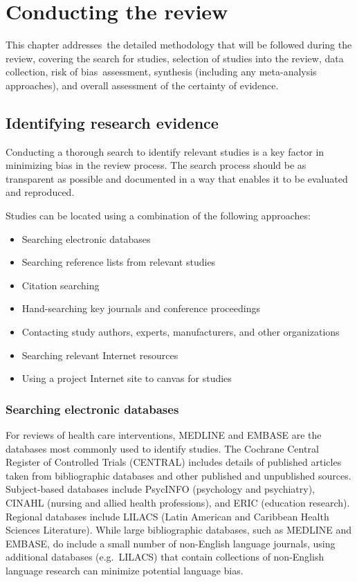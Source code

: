 \documentclass[
  11pt,
  a4paper,
  DIV=11,
  numbers=noendperiod]{scrreprt}
\begin{document}
\chapter{Conducting the
review}\label{sec-conducting-systematic-reviews-of-interventions}

This chapter addresses~the detailed methodology that will be followed
during the review, covering the search for studies, selection of studies
into the review, data collection, risk of bias~assessment, synthesis
(including any meta-analysis approaches), and overall assessment of the
certainty of evidence.~

\section{Identifying research
evidence}\label{identifying-research-evidence}

Conducting a thorough search to identify relevant studies is a key
factor in minimizing bias in the review process. The search process
should be as transparent as possible and documented in a way that
enables it to be evaluated and reproduced.

Studies can be located using a combination of the following approaches:

\begin{itemize}
\item
  Searching electronic databases
\item
  Searching reference lists from relevant studies
\item
  Citation searching
\item
  Hand-searching key journals and conference proceedings
\item
  Contacting study authors, experts, manufacturers, and other
  organizations
\item
  Searching relevant Internet resources
\item
  Using a project Internet site to canvas for studies
\end{itemize}

\subsection{Searching electronic
databases}\label{searching-electronic-databases}

For reviews of health care interventions, MEDLINE and EMBASE are the
databases most commonly used to identify studies. The Cochrane Central
Register of Controlled Trials (CENTRAL) includes details of published
articles taken from bibliographic databases and other published and
unpublished sources. Subject-based databases include PsycINFO
(psychology and psychiatry), CINAHL (nursing and allied health
professions), and ERIC (education research). Regional databases include
LILACS (Latin American and Caribbean Health Sciences Literature). While
large bibliographic databases, such as MEDLINE and EMBASE, do include a
small number of non-English language journals, using additional
databases (e.g.~LILACS) that contain collections of non-English language
research can minimize potential language bias.
\end{document}
